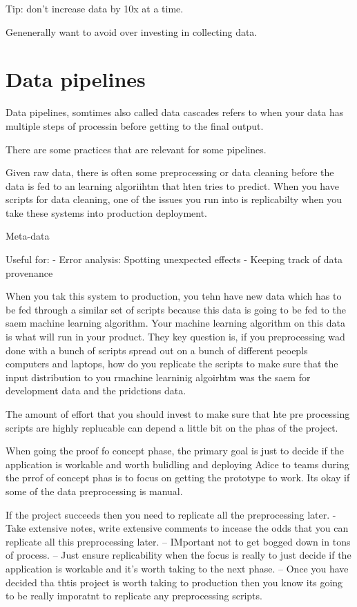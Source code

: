 Tip: don't increase data by 10x at a time.

Genenerally want to avoid over investing in collecting data.


\section{Data pipelines}

Data pipelines, somtimes also called data cascades refers to when your data has multiple steps of processin before getting to the final output.

There are some practices that are relevant for some pipelines.

Given raw data, there is often some preprocessing or data cleaning before the data is fed to an learning algoriihtm that hten tries to predict.
When you have scripts for data cleaning, one of the issues you run into is replicabilty when you take these systems into production deployment.

Meta-data

Useful for:
- Error analysis: Spotting unexpected effects
- Keeping track of data provenance

When you tak this system to production, you tehn have new data which has to be fed through a similar set of scripts because this data is going to be fed to the saem machine learning algorithm.
Your machine learning algorithm on this data is what will run in  your product.
They key question is, if you preprocessing wad done with a bunch of scripts spread out on a bunch of different peoepls computers and laptops, how do you replicate the scripts to make sure that the input distribution to you rmachine learninig algoirhtm was the saem for development data and the pridctions data.


The amount of effort that you should invest to make sure that hte pre processing scripts are highly replucable can depend a little bit on the phas of the project.

When going the proof fo concept phase, the primary goal is just to decide if the application is workable and worth bulidling and deploying
Adice to teams during the prrof of concept phas is to focus on getting the prototype to work.
Its okay if some of the data preprocessing is manual.

If the project succeeds then you need to replicate all the preprocessing later.
- Take extensive notes, write extensive comments to incease the odds that you can replicate all this preprocessing later.
-- IMportant not to get bogged down in tons of process.
-- Just ensure replicability when the focus is really to just decide if the application is workable and it's worth taking to the next phase.
-- Once you have decided tha thtis project is worth taking to production then you know its going to be really imporatnt to replicate any preprocessing scripts.




